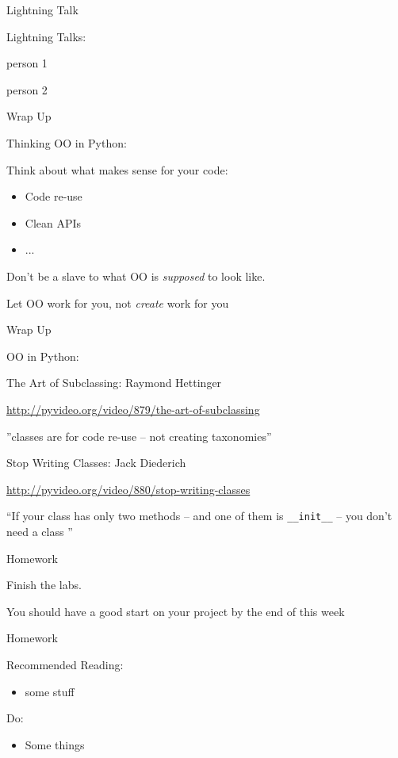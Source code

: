 \documentclass{beamer}
\begin{document}
\begin{frame}{Lightning Talk}

{\LARGE Lightning Talks:}

\vfill
{\large person 1}

\vfill
{\large person 2}

\end{frame}



\begin{frame}[fragile]{Wrap Up}

{\LARGE Thinking OO in Python:}

\vfill
{\large Think about what makes sense for your code:}
\begin{itemize}
  \item {\large Code re-use}
  \item {\large Clean APIs}
  \item {\large ... }
\end{itemize}

\vfill
{\large Don't be a slave to what OO is \emph{supposed} to look like. }

\vfill
{\large Let OO work for you, not \emph{create} work for you}

\end{frame}


\begin{frame}[fragile]{Wrap Up}

{\Large OO in Python:}

\vfill
{\Large The Art of Subclassing}: Raymond Hettinger

\vfill
{\small \url{http://pyvideo.org/video/879/the-art-of-subclassing}}

\vfill
''classes are for code re-use -- not creating taxonomies''

\vfill
{\Large Stop Writing Classes}: Jack Diederich

\vfill
{\small \url{http://pyvideo.org/video/880/stop-writing-classes}}

\vfill
``If your class has only two methods -- and one of them is \verb|__init__|
-- you don't need a class ''
\end{frame}




\begin{frame}[fragile]{Homework}

{\Large Finish the labs.}

{\Large You should have a good start on your project by the end of this week}

\end{frame}
 




\begin{frame}[fragile]{Homework}

Recommended Reading:
\begin{itemize}
  \item some stuff
\end{itemize}

Do:
\begin{itemize}
    \item Some things    
\end{itemize}

\end{frame}
\end{document}
